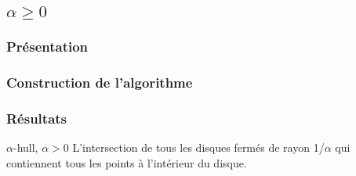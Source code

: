 \subsection{$\alpha \geq 0$}

\subsubsection{Présentation}

\subsubsection{Construction de l'algorithme}

\subsubsection{Résultats}
\begin{Definition}{$\alpha$-hull, $\alpha > 0$}
\label{def:pas}
      L'intersection de tous les disques fermés de rayon 1/$\alpha$ qui contiennent tous les points à l’intérieur du disque.
\end{Definition}




